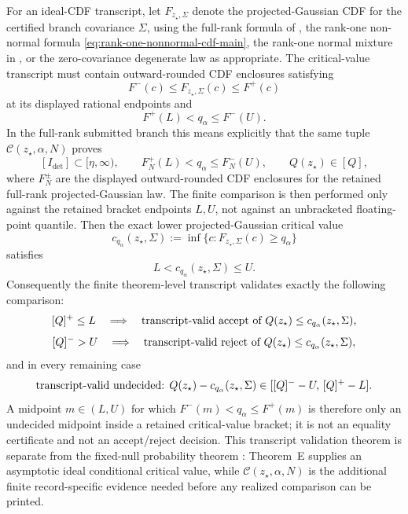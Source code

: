 \begin{algorithmiclemma}
For an ideal-CDF transcript, let \(F_{z_\star,\Sigma}\) denote the
projected-Gaussian CDF for the certified branch covariance \(\Sigma\), using
the full-rank formula of
, the
rank-one non-normal formula
\eqref{eq:rank-one-nonnormal-cdf-main}, the rank-one normal mixture in
, or the
zero-covariance degenerate law as appropriate.  The critical-value transcript
must contain outward-rounded CDF enclosures satisfying
\[
F^-(c)\le F_{z_\star,\Sigma}(c)\le F^+(c)
\]
at its displayed rational endpoints and
\begin{equation}\label{eq:certified-diagonal-critical-bracket-main}
F^+(L)<q_\alpha\le F^-(U).
\end{equation}
In the full-rank submitted branch this means explicitly that the same tuple
\(\mathcal C(z_\star,\alpha,N)\) proves
\[
[I_{\det}]\subset[\eta,\infty),
\qquad
F_N^+(L)<q_\alpha\le F_N^-(U),
\qquad
Q(z_\star)\in[Q],
\]
where \(F_N^\pm\) are the displayed outward-rounded CDF enclosures for the
retained full-rank projected-Gaussian law.  The finite comparison is then
performed only against the retained bracket endpoints \(L,U\), not against an
unbracketed floating-point quantile.
Then the exact lower projected-Gaussian critical value
\[
c_{q_\alpha}(z_\star,\Sigma):=\inf\{c:F_{z_\star,\Sigma}(c)\ge q_\alpha\}
\]
satisfies
\[
L<c_{q_\alpha}(z_\star,\Sigma)\le U.
\]
Consequently the finite theorem-level transcript validates exactly the
following comparison:
\[
[Q]^+\le L
\quad\Longrightarrow\quad
\text{\rm transcript-valid accept of } Q(z_\star)\le c_{q_\alpha}(z_\star,\Sigma),
\]
\[
[Q]^->U
\quad\Longrightarrow\quad
\text{\rm transcript-valid reject of } Q(z_\star)\le c_{q_\alpha}(z_\star,\Sigma),
\]
and in every remaining case
\[
\text{\rm transcript-valid undecided: } Q(z_\star)-c_{q_\alpha}(z_\star,\Sigma)
\in [[Q]^--U,\,[Q]^+-L].
\]
A midpoint \(m\in(L,U)\) for which \(F^-(m)<q_\alpha\le F^+(m)\) is therefore only
an undecided midpoint inside a retained critical-value bracket; it is not an
equality certificate and not an accept/reject decision.  This transcript
validation theorem is separate from the fixed-null probability theorem
: Theorem~E supplies an
asymptotic ideal conditional critical value, while
\(\mathcal C(z_\star,\alpha,N)\) is the additional finite record-specific
evidence needed before any realized comparison can be printed.


\end{algorithmiclemma}
